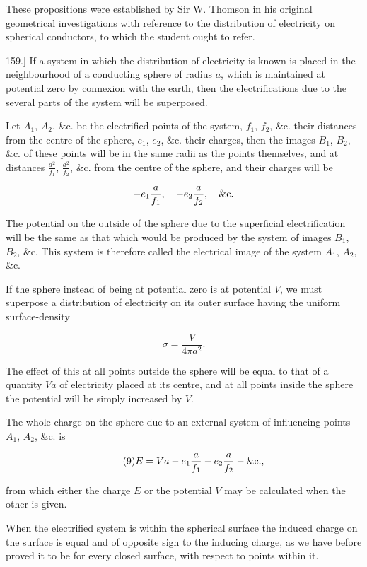 \documentclass[11pt,a4paper]{article}
\begin{document}
These propositions were established by Sir W. Thomson in his original geometrical investigations with reference to the distribution of electricity on spherical conductors, to which the student ought to refer.

159.] If a system in which the distribution of electricity is known is placed in the neighbourhood of a conducting sphere of radius $a$, which is maintained at potential zero by connexion with the earth, then the electrifications due to the several parts of the system will be superposed.

Let $A_1$, $A_2$, \&c. be the electrified points of the system, $f_1$, $f_2$, \&c. their distances from the centre of the sphere, $e_1$, $e_2$, \&c. their charges, then the images $B_1$, $B_2$, \&c. of these points will be in the same radii as the points themselves, and at distances $\frac{a^2}{f_1}$, $\frac{a^2}{f_2}$, \&c. from the centre of the sphere, and their charges will be

\[
-e_1\frac{a}{f_1},\quad -e_2\frac{a}{f_2},\quad\hbox{\&c.}
\]

The potential on the outside of the sphere due to the superficial electrification will be the same as that which would be produced by the system of images $B_1$, $B_2$, \&c. This system is therefore called the electrical image of the system $A_1$, $A_2$, \&c.

If the sphere instead of being at potential zero is at potential $V$, we must superpose a distribution of electricity on its outer surface having the uniform surface-density

\[
\sigma=\frac{V}{4\pi a^2}.
\]

The effect of this at all points outside the sphere will be equal to that of a quantity $Va$ of electricity placed at its centre, and at all points inside the sphere the potential will be simply increased by $V$.

The whole charge on the sphere due to an external system of influencing points $A_1$, $A_2$, \&c. is

\begin{equation}\tag{9}
E=Va-e_1\frac{a}{f_1}-e_2\frac{a}{f_2}-\hbox{\&c.},
\end{equation}

from which either the charge $E$ or the potential $V$ may be calculated when the other is given.

When the electrified system is within the spherical surface the induced charge on the surface is equal and of opposite sign to the inducing charge, as we have before proved it to be for every closed surface, with respect to points within it.
\end{document}
